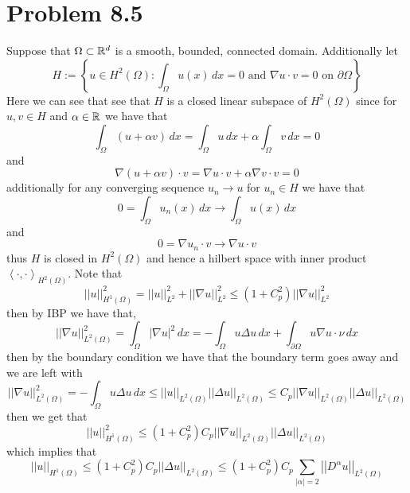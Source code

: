 \documentclass[12pt]{report}
\newcommand{\norm}[1]{\left|\left|#1\right|\right|}
\newcommand{\inner}[2]{\left\langle#1,#2\right\rangle}
\begin{document}
\section*{Problem 8.5}
Suppose that $\Omega \subset \mathbb{R}^d$ is a smooth, bounded, connected domain. Additionally let 
\begin{equation*}
  H := \left\{ u \in H^2(\Omega) : \int_{\Omega} u(x) \,dx = 0 \text{ and } \nabla u \cdot v = 0 \text{ on } \partial \Omega \right\}
\end{equation*}
Here we can see that see that $H$ is a closed linear subspace of $H^2(\Omega)$ since for $u,v \in H$ and $\alpha \in \mathbb{R}$ we have that
\begin{equation*}
  \int_{\Omega} (u + \alpha v) \,dx = \int_{\Omega} u \,dx + \alpha \int_{\Omega} v \,dx = 0
\end{equation*}
and
\begin{equation*}
  \nabla (u + \alpha v) \cdot v = \nabla u \cdot v + \alpha \nabla v \cdot v = 0
\end{equation*}
additionally for any converging sequence $u_n \to u$ for $u_n \in H$ we have that
\begin{equation*}
  0 = \int_{\Omega} u_n(x) \,dx \to \int_{\Omega} u(x) \,dx
\end{equation*}
and
\begin{equation*}
  0 = \nabla u_n \cdot v \to \nabla u \cdot v
\end{equation*}
thus $H$ is closed in $H^2(\Omega)$ and hence a hilbert space with inner product $\inner{\cdot}{\cdot}_{H^2(\Omega)}$. 
Note that
\begin{equation*}
\norm{u}_{H^1(\Omega)}^2 = \norm{u}_{L^2}^2 + \norm{\nabla u}_{L^2}^2 \leq (1 + C_p^2) \norm{\nabla u}_{L^2}^2  
\end{equation*}
then by IBP we have that,
\begin{equation*}
  \norm{\nabla u}_{L^2(\Omega)}^2 = \int_{\Omega} |\nabla u|^2 \,dx = -\int_{\Omega} u \Delta u \, dx + \int_{\partial \Omega} u \nabla u \cdot \nu \, dx
\end{equation*}
then by the boundary condition we have that the boundary term goes away and we are left with
\begin{equation*}
  \norm{\nabla u}_{L^2(\Omega)}^2 = -\int_{\Omega} u \Delta u \, dx \leq \norm{u}_{L^2(\Omega)} \norm{\Delta u}_{L^2(\Omega)} \leq C_p \norm{\nabla u}_{L^2(\Omega)} \norm{\Delta u}_{L^2(\Omega)}
\end{equation*}
then we get that
\begin{equation*}
  \norm{u}_{H^1(\Omega)}^2 \leq (1 + C_p^2)C_p \norm{\nabla u}_{L^2(\Omega)} \norm{\Delta u}_{L^2(\Omega)}
\end{equation*}
which implies that
\begin{equation*}
  \norm{u}_{H^1(\Omega)} \leq (1 + C_p^2)C_p \norm{\Delta u}_{L^2(\Omega)} \leq (1 + C_p^2)C_p \sum_{|\alpha| = 2} \norm{D^\alpha u}_{L^2(\Omega)} 
\end{equation*}
\end{document}
